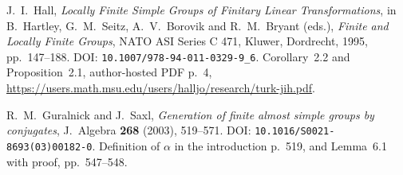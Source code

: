 J.~I.~Hall, \emph{Locally Finite Simple Groups of Finitary Linear
Transformations}, in B.~Hartley, G.~M.~Seitz, A.~V.~Borovik and
R.~M.~Bryant (eds.), \emph{Finite and Locally Finite Groups}, NATO ASI
Series C 471, Kluwer, Dordrecht, 1995, pp.~147--188.
DOI: \texttt{10.1007/978-94-011-0329-9\_6}.
Corollary~2.2 and Proposition~2.1, author-hosted PDF p.~4,
\url{https://users.math.msu.edu/users/halljo/research/turk-jih.pdf}.

R.~M.~Guralnick and J.~Saxl, \emph{Generation of finite almost simple
groups by conjugates}, J.~Algebra \textbf{268} (2003), 519--571.
DOI: \texttt{10.1016/S0021-8693(03)00182-0}.
Definition of $\alpha$ in the introduction p.~519, and Lemma~6.1
with proof, pp.~547--548.
